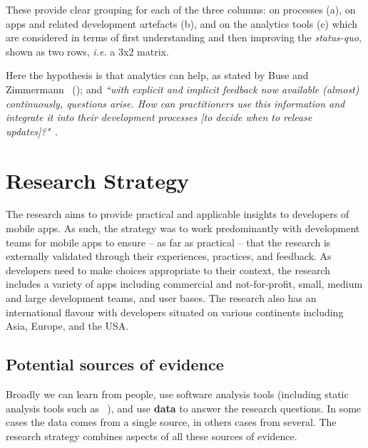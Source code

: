 These provide clear grouping for each of the three columns: on processes (a), on apps and related development artefacts (b), and on the analytics tools (c) which are considered in terms of first understanding and then improving the \emph{status-quo}, shown as two rows, \emph{i.e.} a 3x2 matrix. 


Here the hypothesis is that analytics can help, as stated by Buse and Zimmermann ~(\citeyear{buse_analytics_2010}); and \emph{``with explicit and implicit feedback now available (almost) continuously, questions arise. How can practitioners use this information and integrate it into their development processes [to decide when to release updates]?"}~.

\section{Research Strategy}
The research aims to provide practical and applicable insights to developers of mobile apps. As such, the strategy was to work predominantly with development teams for mobile apps to ensure -- as far as practical -- that the research is externally validated through their experiences, practices, and feedback. As developers need to make choices appropriate to their context, the research includes a variety of apps including commercial and not-for-profit, small, medium and large development teams, and user bases. The research also has an international flavour with developers situated on various continents including Asia, Europe, and the USA.

\subsection{Potential sources of evidence}
Broadly we can learn from people, use software analysis tools (including static analysis tools such as ~), and use \textbf{data} to answer the research questions. In some cases the data comes from a single source, in others cases from several. The research strategy combines aspects of all these sources of evidence. %


